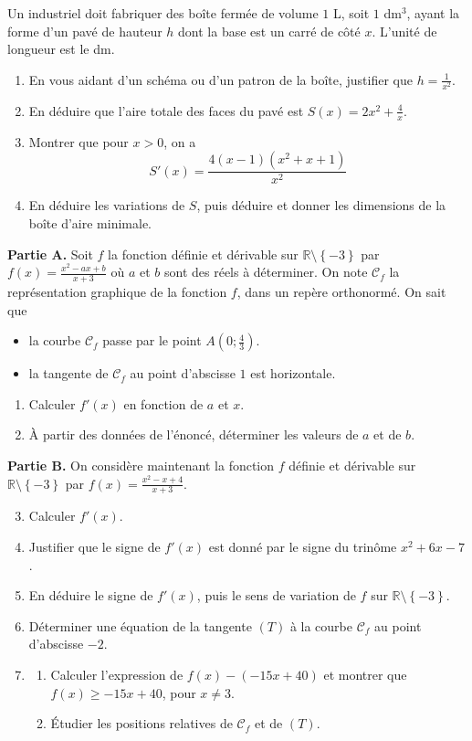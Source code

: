\documentclass[11pt]{article}
\begin{document}
\begin{exo}
Un industriel doit fabriquer des boîte fermée de volume $1$ L, soit $1$ dm$^3$,
ayant la forme d'un pavé de hauteur $h$ dont la base est un carré de côté $x$.
L'unité de longueur est le dm.
\begin{enumerate}
  \item En vous aidant d'un schéma ou d'un patron de la boîte, justifier que
    $h=\frac{1}{x^2}$.
  \item En déduire que l'aire totale des faces du pavé est
    $S(x)=2x^2+\frac{4}{x}$.
  \item Montrer que pour $x>0$, on a
    \[
      S'(x) = \frac{4(x-1)(x^2+x+1)}{x^2}
    \]
  \item En déduire les variations de $S$, puis déduire et donner les dimensions
    de la boîte d'aire minimale.
\end{enumerate}
\end{exo}

\begin{exo}
\textbf{Partie A.} Soit $f$ la fonction définie et dérivable sur
$\mathbb{R}\setminus\left\{ -3 \right\}$ par $f(x)=\frac{x^2-ax+b}{x+3}$ où $a$ et
$b$ sont des réels à déterminer. On note $\mathscr C_f$ la représentation
graphique de la fonction $f$, dans un repère orthonormé. On sait que
\begin{itemize}
  \item la courbe $\mathscr C_f$ passe par le point $A\left( 0;
    \frac{4}{3} \right)$.
  \item la tangente de $\mathscr C_f$ au point d'abscisse $1$ est horizontale.
\end{itemize}
\begin{enumerate}
  \item Calculer $f'(x)$ en fonction de $a$ et $x$.
  \item À partir des données de l'énoncé, déterminer les valeurs de $a$ et de
    $b$.
\end{enumerate}
\textbf{Partie B.} On considère maintenant la fonction $f$ définie et dérivable
sur $\mathbb{R}\setminus\left\{ -3 \right\}$ par $f(x)=\frac{x^2-x+4}{x+3}$.
\begin{enumerate}
    \setcounter{enumi}{2}
  \item Calculer $f'(x)$.
  \item Justifier que le signe de $f'(x)$ est donné par le signe du trinôme
    $x^2+6x-7$.
  \item En déduire le signe de $f'(x)$, puis le sens de variation de $f$ sur
    $\mathbb{R}\setminus\left\{ -3 \right\}$.
  \item Déterminer une équation de la tangente $(T)$ à la courbe $\mathscr C_f$
    au point d'abscisse $-2$.
  \item \begin{enumerate}
      \item Calculer l'expression de $f(x)-(-15x+40)$ et montrer que $f(x)\geq
        -15x+40$, pour $x\neq3$.
      \item Étudier les positions relatives de $\mathscr C_f$ et de $(T)$.
    \end{enumerate}
\end{enumerate}
\end{exo}
\end{document}
